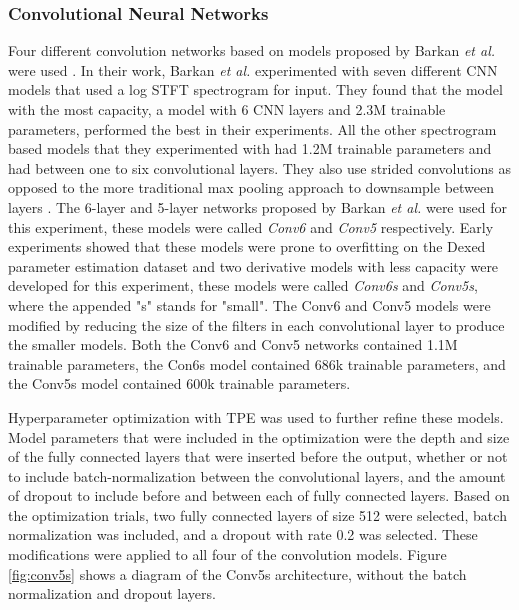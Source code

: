 \subsubsection{Convolutional Neural Networks}
Four different convolution networks based on models proposed by Barkan \textit{et al.} were used \cite{barkan2019inversynth}. In their work, Barkan \textit{et al.} experimented with seven different CNN models that used a log STFT spectrogram for input. They found that the model with the most capacity, a model with 6 CNN layers and 2.3M trainable parameters, performed the best in their experiments. All the other spectrogram based models that they experimented with had 1.2M trainable parameters and had between one to six convolutional layers. They also use strided convolutions as opposed to the more traditional max pooling approach to downsample between layers \cite{goodfellow2016deep}. The 6-layer and 5-layer networks proposed by Barkan \textit{et al.} were used for this experiment, these models were called \textit{Conv6} and \textit{Conv5} respectively. Early experiments showed that these models were prone to overfitting on the Dexed parameter estimation dataset and two derivative models with less capacity were developed for this experiment, these models were called \textit{Conv6s} and \textit{Conv5s}, where the appended "s" stands for "small". The Conv6 and Conv5 models were modified by reducing the size of the filters in each convolutional layer to produce the smaller models. Both the Conv6 and Conv5 networks contained 1.1M trainable parameters, the Con6s model contained 686k trainable parameters, and the Conv5s model contained 600k trainable parameters. 

Hyperparameter optimization with TPE was used to further refine these models. Model parameters that were included in the optimization were the depth and size of the fully connected layers that were inserted before the output, whether or not to include batch-normalization between the convolutional layers, and the amount of dropout to include before and between each of fully connected layers. Based on the optimization trials, two fully connected layers of size 512 were selected, batch normalization was included, and a dropout with rate 0.2 was selected. These modifications were applied to all four of the convolution models. Figure \ref{fig:conv5s} shows a diagram of the Conv5s architecture, without the batch normalization and dropout layers.

